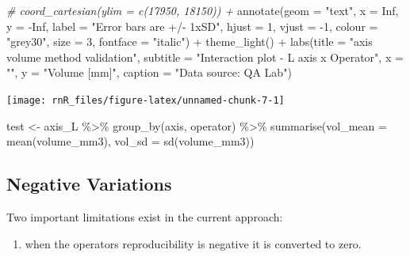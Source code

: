 \documentclass[
]{book}
\newenvironment{Shaded}{\begin{snugshade}}{\end{snugshade}}
\newcommand{\AttributeTok}[1]{\textcolor[rgb]{0.77,0.63,0.00}{#1}}
\newcommand{\CommentTok}[1]{\textcolor[rgb]{0.56,0.35,0.01}{\textit{#1}}}
\newcommand{\ConstantTok}[1]{\textcolor[rgb]{0.00,0.00,0.00}{#1}}
\newcommand{\DecValTok}[1]{\textcolor[rgb]{0.00,0.00,0.81}{#1}}
\newcommand{\FunctionTok}[1]{\textcolor[rgb]{0.00,0.00,0.00}{#1}}
\newcommand{\NormalTok}[1]{#1}
\newcommand{\OtherTok}[1]{\textcolor[rgb]{0.56,0.35,0.01}{#1}}
\newcommand{\SpecialCharTok}[1]{\textcolor[rgb]{0.00,0.00,0.00}{#1}}
\newcommand{\StringTok}[1]{\textcolor[rgb]{0.31,0.60,0.02}{#1}}
\providecommand{\tightlist}{%
  \setlength{\itemsep}{0pt}\setlength{\parskip}{0pt}}
\begin{document}
\begin{Shaded}
\begin{Highlighting}[]
  \CommentTok{\# coord\_cartesian(ylim = c(17950, 18150)) +}
  \FunctionTok{annotate}\NormalTok{(}\AttributeTok{geom =} \StringTok{"text"}\NormalTok{, }\AttributeTok{x =} \ConstantTok{Inf}\NormalTok{, }\AttributeTok{y =} \SpecialCharTok{{-}}\ConstantTok{Inf}\NormalTok{, }\AttributeTok{label =} \StringTok{"Error bars are +/{-} 1xSD"}\NormalTok{, }
    \AttributeTok{hjust =} \DecValTok{1}\NormalTok{, }\AttributeTok{vjust =} \SpecialCharTok{{-}}\DecValTok{1}\NormalTok{, }\AttributeTok{colour =} \StringTok{"grey30"}\NormalTok{, }\AttributeTok{size =} \DecValTok{3}\NormalTok{, }
    \AttributeTok{fontface =} \StringTok{"italic"}\NormalTok{) }\SpecialCharTok{+}
  \FunctionTok{theme\_light}\NormalTok{() }\SpecialCharTok{+}
  \FunctionTok{labs}\NormalTok{(}\AttributeTok{title =} \StringTok{"axis volume method validation"}\NormalTok{,}
       \AttributeTok{subtitle =} \StringTok{"Interaction plot {-} L axis x Operator"}\NormalTok{,}
       \AttributeTok{x =} \StringTok{""}\NormalTok{,}
       \AttributeTok{y =} \StringTok{"Volume [mm]"}\NormalTok{,}
       \AttributeTok{caption =} \StringTok{"Data source: QA Lab"}\NormalTok{)}
\end{Highlighting}
\end{Shaded}

\texttt{[image: rnR\_files/figure-latex/unnamed-chunk-7-1]}

\begin{Shaded}
\begin{Highlighting}[]
\NormalTok{test }\OtherTok{\textless{}{-}}\NormalTok{ axis\_L }\SpecialCharTok{\%\textgreater{}\%}
  \FunctionTok{group\_by}\NormalTok{(axis, operator) }\SpecialCharTok{\%\textgreater{}\%}
  \FunctionTok{summarise}\NormalTok{(}\AttributeTok{vol\_mean =} \FunctionTok{mean}\NormalTok{(volume\_mm3), }\AttributeTok{vol\_sd =} \FunctionTok{sd}\NormalTok{(volume\_mm3))}
\end{Highlighting}
\end{Shaded}

\hypertarget{negative-variations}{%
\subsection{Negative Variations}\label{negative-variations}}

Two important limitations exist in the current approach:

\begin{enumerate}
\def\labelenumi{\arabic{enumi})}
\tightlist
\item
  when the operators reproducibility is negative it is converted to zero.
\end{enumerate}
\end{document}
